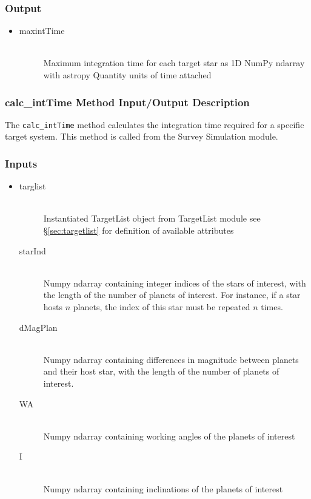 \documentclass[cleanfoot]{asme2ej}
\begin{document}
\subsubsection*{Output}
\begin{itemize}
    \item
    \begin{description}
        \item[maxintTime] \hfill \\
        Maximum integration time for each target star as 1D NumPy ndarray with astropy Quantity units of time attached
    \end{description}
\end{itemize}

\subsubsection{calc\_intTime Method Input/Output Description} \label{sec:calcintTimetask}
The \verb+calc_intTime+ method calculates the integration time required for a specific target system.  This method is called from the Survey Simulation module.
\subsubsection*{Inputs}
\begin{itemize}
    \item 
    \begin{description}
        \item[targlist] \hfill \\
        Instantiated TargetList object from TargetList module see \S\ref{sec:targetlist} for definition of available attributes
        \item[starInd] \hfill \\
        Numpy ndarray containing integer indices of the stars of interest, with the length of the number of planets of interest. For instance, if a star hosts $n$ planets, the index of this star must be repeated $n$ times.
        \item[dMagPlan] \hfill \\
        Numpy ndarray containing differences in magnitude between planets and their host star, with the length of the number of planets of interest.
        \item[WA] \hfill \\
        Numpy ndarray containing working angles of the planets of interest
        \item[I] \hfill \\
        Numpy ndarray containing inclinations of the planets of interest
    \end{description}
\end{itemize}
\end{document}
